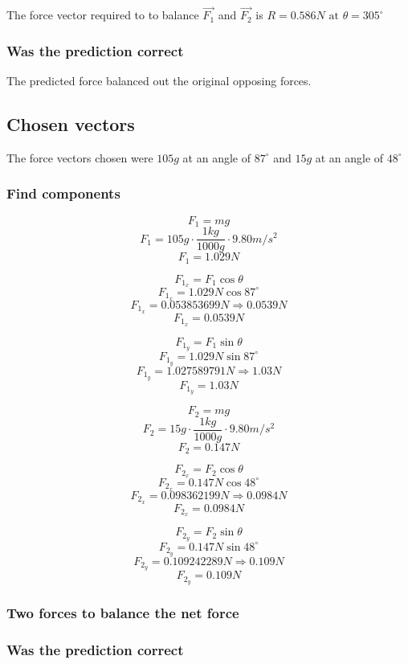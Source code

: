\documentclass[11pt, letterpaper, includehead]{article}
\begin{document}
The force vector required to to balance $\vec{F_1}$ and $\vec{F_2}$ is
$R = 0.586N \text{ at } \theta = 305^{\circ}$

\subsubsection{Was the prediction correct} %
The predicted force balanced out the original opposing forces. 

\subsection{Chosen vectors} %
The force vectors chosen were $105g$ at an angle of $87^{\circ}$ and $15g$ at an angle of $48^{\circ}$

\subsubsection{Find components} %
\begin{multicols}{2}
  $$F_1 = mg$$
  $$F_1 = 105g \cdot \frac{1kg}{1000g} \cdot 9.80m/s^2$$
  $$F_1 = 1.029N$$

  $$F_{1_x} = F_1\cos\theta$$
  $$F_{1_x} = 1.029N\cos87^{\circ}$$
  $$F_{1_x} = 0.053853699N \Rightarrow 0.0539N$$
  $$\boxed{F_{1_x} = 0.0539N}$$

  $$F_{1_y} = F_1\sin\theta$$
  $$F_{1_y} = 1.029N\sin87^{\circ}$$
  $$F_{1_y} = 1.027589791N \Rightarrow 1.03N$$
  $$\boxed{F_{1_y} = 1.03N}$$

  \columnbreak
  $$F_2 = mg$$
  $$F_2 = 15g \cdot \frac{1kg}{1000g} \cdot 9.80m/s^2$$
  $$F_2 = 0.147N$$

  $$F_{2_x} = F_2\cos\theta$$
  $$F_{2_x} = 0.147N\cos48^{\circ}$$
  $$F_{2_x} = 0.098362199N \Rightarrow 0.0984N$$
  $$\boxed{F_{2_x} = 0.0984N}$$

  $$F_{2_y} = F_2\sin\theta$$
  $$F_{2_y} = 0.147N\sin48^{\circ}$$
  $$F_{2_y} = 0.109242289N \Rightarrow 0.109N$$
  $$\boxed{F_{2_y} = 0.109N}$$
 
\end{multicols}


\subsubsection{Two forces to balance the net force} %

\subsubsection{Was the prediction correct} %
\end{document}
